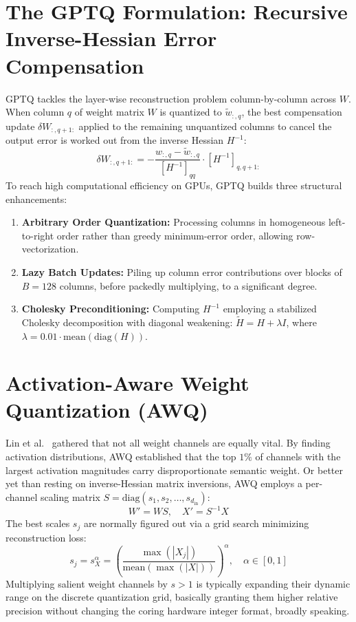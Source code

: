 \documentclass[12pt,a4paper,oneside]{report}
\begin{document}
    \section{The GPTQ Formulation: Recursive Inverse-Hessian Error Compensation}
    GPTQ \cite{frantar2023gptq} tackles the layer-wise reconstruction problem column-by-column across $W$. When column $q$ of weight matrix $W$ is quantized to $\widetilde{w}_{:, q}$, the best compensation update $\delta W_{:, q+1:}$ applied to the remaining unquantized columns to cancel the output error is worked out from the inverse Hessian $H^{-1}$:
    \begin{equation}
        \delta W_{:, q+1:} = - \frac{w_{:, q} - \widetilde{w}_{:, q}}{[H^{-1}]_{qq}} \cdot [H^{-1}]_{q, q+1:}
    \end{equation}
    To reach high computational efficiency on GPUs, GPTQ builds three structural enhancements:
    \begin{enumerate}
        \item \textbf{Arbitrary Order Quantization:} Processing columns in homogeneous left-to-right order rather than greedy minimum-error order, allowing row-vectorization.
        \item \textbf{Lazy Batch Updates:} Piling up column error contributions over blocks of $B = 128$ columns, before packedly multiplying, to a significant degree.
        \item \textbf{Cholesky Preconditioning:} Computing $H^{-1}$ employing a stabilized Cholesky decomposition with diagonal weakening: $\widetilde{H} = H + \lambda I$, where $\lambda = 0.01 \cdot \text{mean}(\text{diag}(H))$.
    \end{enumerate}

    \section{Activation-Aware Weight Quantization (AWQ)}
    Lin et al.~\cite{lin2024awq} gathered that not all weight channels are equally vital. By finding activation distributions, AWQ established that the top $1\%$ of channels with the largest activation magnitudes carry disproportionate semantic weight. Or better yet than resting on inverse-Hessian matrix inversions, AWQ employs a per-channel scaling matrix $S = \text{diag}(s_1, s_2, \dots, s_{d_{\text{in}}})$:
    \begin{equation}
        W' = W S, \quad X' = S^{-1} X
    \end{equation}
    The best scales $s_j$ are normally figured out via a grid search minimizing reconstruction loss:
    \begin{equation}
        s_j = s_X^{\alpha} = \left( \frac{\max(|X_j|)}{\text{mean}(\max(|X|))} \right)^\alpha, \quad \alpha \in [0, 1]
    \end{equation}
    Multiplying salient weight channels by $s > 1$ is typically expanding their dynamic range on the discrete quantization grid, basically granting them higher relative precision without changing the coring hardware integer format, broadly speaking.
\end{document}
